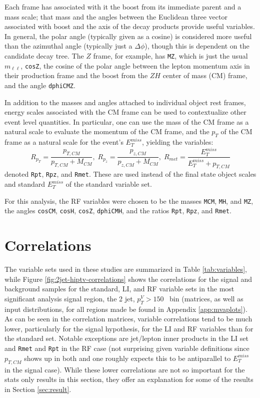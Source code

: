 Each frame has associated with it the boost from its immediate parent and a mass scale; that mass and the angles between the Euclidean three vector associated with boost and the axis of the decay products provide useful variables.  In general, the polar angle (typically given as a cosine) is considered more useful than the azimuthal angle (typically just a $\Delta\phi$), though this is dependent on the candidate decay tree.  The $Z$ frame, for example, has \texttt{MZ}, which is just the usual $m_{\ell\ell}$, \texttt{cosZ}, the cosine of the polar angle between the lepton momentum axis in their production frame and the boost from the $ZH$ center of mass (CM) frame, and the angle \texttt{dphiCMZ}.

In addition to the masses and angles attached to individual object rest frames, energy scales associated with the CM frame can be used to contextualize other event level quantities.  In particular, one can use the mass of the CM frame as a natural scale to evaluate the momentum of the CM frame, and the $p_T$ of the CM frame as a natural scale for the event's $E_T^{miss}$, yielding the variables:
\begin{equation}
\label{eqn:Rrjr}
R_{p_T} = \frac{p_{T,CM}}{p_{T,CM}+M_{CM}},\;R_{p_z} = \frac{p_{z,CM}}{p_{z,CM}+M_{CM}},\;R_{met} = \frac{E_T^{miss}}{E_T^{miss}+p_{T,CM}}
\end{equation}
denoted \texttt{Rpt}, \texttt{Rpz}, and \texttt{Rmet}.  These are used instead of the final state object scales and standard $E_T^{miss}$ of the standard variable set.

For this analysis, the RF variables were chosen to be the masses \texttt{MCM}, \texttt{MH}, and \texttt{MZ}, the angles \texttt{cosCM}, \texttt{cosH}, \texttt{cosZ}, \texttt{dphiCMH}, and the ratios \texttt{Rpt}, \texttt{Rpz}, and \texttt{Rmet}.

\section{Correlations}
The variable sets used in these studies are summarized in Table \ref{tab:variables}, while Figure \ref{fig:2jet-hiptv-correlations} shows the correlations for the signal and background samples for the standard, LI, and RF variable sets in the most significant analysis signal region, the 2 jet, $p_T^V>150$ \GeV\, bin (matrices, as well as input distributions, for all regions made be found in Appendix \ref{app:mvaplots}).  As can be seen in the correlation matrices, variable correlations tend to be much lower, particularly for the signal hypothesis, for the LI and RF variables than for the standard set.  Notable exceptions are jet/lepton inner products in the LI set and \texttt{Rmet} and \texttt{Rpt} in the RF case (not surprising given variable definitions since $p_{T,CM}$ shows up in both and one roughly expects this to be antiparallel to $E_T^{miss}$ in the signal case).  While these lower correlations are not so important for the stats only results in this section, they offer an explanation for some of the results in Section \ref{sec:result}.

